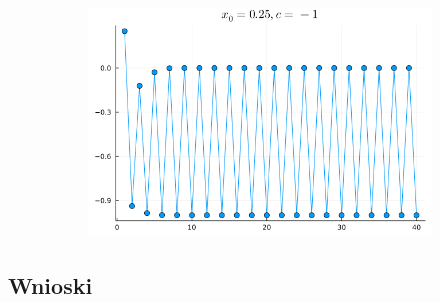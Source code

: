 \documentclass{article}
\def\v{0.47}
\begin{document}
\begin{figure}[H]
\begin{subfigure}[b]{\v\linewidth}
		\end{subfigure}
		\begin{subfigure}[b]{\v\linewidth}
			\includegraphics[width=\linewidth]{graphs/7.png}
		\end{subfigure}
	\end{figure}
\subsection*{Wnioski}
\end{document}
